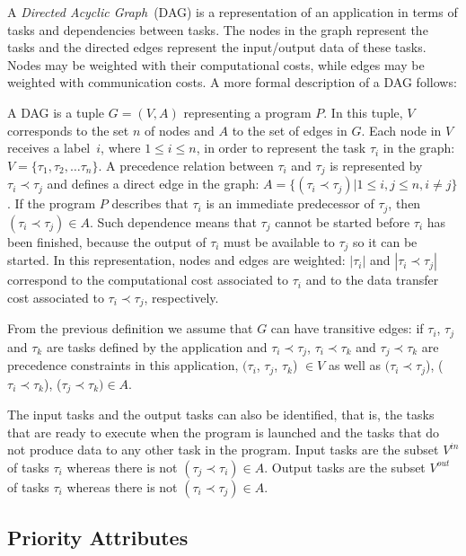\documentclass[twocolumn]{svjour3}
\begin{document}
A \emph{Directed Acyclic Graph}~(DAG) is a representation of an application in terms of tasks and dependencies between tasks. The nodes in the graph represent the tasks and the directed edges represent the input/output data of these tasks. Nodes may be weighted with their computational costs, while edges may be weighted with communication costs. A more formal description of a DAG follows: 

\begin{definition}
A DAG is a tuple $G = (V, A) $ representing a program $P$. In this tuple, $V$ corresponds to the set $n$ of nodes and $A$ to the set of edges in $G$. Each node in $V$ receives a label~$i$, where $1 \le i \le n$, in order to represent the task $\tau_i$ in the graph: $V = \{\tau_1, \tau_2, … \tau_n\}$.
A precedence relation between $\tau_i$ and $\tau_j$ is represented by $\tau_i \prec \tau_j$ and defines a direct edge in the graph: $A = \{(\tau_i \prec \tau_j) | 1 \le i,j \le n, i \neq j\}$. If the program $P$ describes that $\tau_i$ is an immediate predecessor of $\tau_j$, then $(\tau_i \prec \tau_j) \in A$. Such dependence means that $\tau_j$ cannot be started before $\tau_i$ has been finished, because the output of $\tau_i$ must be available to $\tau_j$ so it can be started.
In this representation, nodes and edges are weighted: $|\tau_i|$ and $|\tau_i \prec \tau_j|$ correspond to the computational cost associated to $\tau_i$ and to the data transfer cost associated to $\tau_i \prec \tau_j$, respectively. 
\end{definition}

From the previous definition we assume that $G$ can have transitive edges: if $\tau_i$, $\tau_j$ and $\tau_k$ are tasks defined by the application and $\tau_i \prec \tau_j$, $\tau_i \prec \tau_k$ and $\tau_j \prec \tau_k$ are precedence constraints in this application, $(\tau_i$, $\tau_j$, $\tau_k$) $\in V$ as well as $(\tau_i \prec \tau_j$), ($\tau_i \prec \tau_k$), ($\tau_j \prec \tau_k) \in A$.

The input tasks and the output tasks can also be identified, that is, the tasks that are ready to execute when the program is launched and the tasks that do not produce data to any other task in the program. Input tasks are the subset $V^{in}$ of tasks $\tau_i$ whereas there is not $(\tau_j \prec \tau_i) \in A$. Output tasks are the subset $V^{out}$ of tasks $\tau_i$ whereas there is not $(\tau_i \prec \tau_j) \in A$.

\subsection{Priority Attributes}
\label{sub:priority_attributes}
\end{document}

